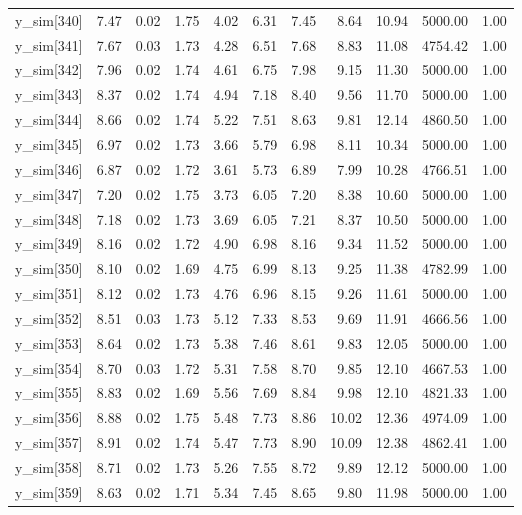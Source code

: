 \begin{table}[ht]
\begin{tabular}{rrrrrrrrrrr}
  y\_sim[340] & 7.47 & 0.02 & 1.75 & 4.02 & 6.31 & 7.45 & 8.64 & 10.94 & 5000.00 & 1.00 \\ 
  y\_sim[341] & 7.67 & 0.03 & 1.73 & 4.28 & 6.51 & 7.68 & 8.83 & 11.08 & 4754.42 & 1.00 \\ 
  y\_sim[342] & 7.96 & 0.02 & 1.74 & 4.61 & 6.75 & 7.98 & 9.15 & 11.30 & 5000.00 & 1.00 \\ 
  y\_sim[343] & 8.37 & 0.02 & 1.74 & 4.94 & 7.18 & 8.40 & 9.56 & 11.70 & 5000.00 & 1.00 \\ 
  y\_sim[344] & 8.66 & 0.02 & 1.74 & 5.22 & 7.51 & 8.63 & 9.81 & 12.14 & 4860.50 & 1.00 \\ 
  y\_sim[345] & 6.97 & 0.02 & 1.73 & 3.66 & 5.79 & 6.98 & 8.11 & 10.34 & 5000.00 & 1.00 \\ 
  y\_sim[346] & 6.87 & 0.02 & 1.72 & 3.61 & 5.73 & 6.89 & 7.99 & 10.28 & 4766.51 & 1.00 \\ 
  y\_sim[347] & 7.20 & 0.02 & 1.75 & 3.73 & 6.05 & 7.20 & 8.38 & 10.60 & 5000.00 & 1.00 \\ 
  y\_sim[348] & 7.18 & 0.02 & 1.73 & 3.69 & 6.05 & 7.21 & 8.37 & 10.50 & 5000.00 & 1.00 \\ 
  y\_sim[349] & 8.16 & 0.02 & 1.72 & 4.90 & 6.98 & 8.16 & 9.34 & 11.52 & 5000.00 & 1.00 \\ 
  y\_sim[350] & 8.10 & 0.02 & 1.69 & 4.75 & 6.99 & 8.13 & 9.25 & 11.38 & 4782.99 & 1.00 \\ 
  y\_sim[351] & 8.12 & 0.02 & 1.73 & 4.76 & 6.96 & 8.15 & 9.26 & 11.61 & 5000.00 & 1.00 \\ 
  y\_sim[352] & 8.51 & 0.03 & 1.73 & 5.12 & 7.33 & 8.53 & 9.69 & 11.91 & 4666.56 & 1.00 \\ 
  y\_sim[353] & 8.64 & 0.02 & 1.73 & 5.38 & 7.46 & 8.61 & 9.83 & 12.05 & 5000.00 & 1.00 \\ 
  y\_sim[354] & 8.70 & 0.03 & 1.72 & 5.31 & 7.58 & 8.70 & 9.85 & 12.10 & 4667.53 & 1.00 \\ 
  y\_sim[355] & 8.83 & 0.02 & 1.69 & 5.56 & 7.69 & 8.84 & 9.98 & 12.10 & 4821.33 & 1.00 \\ 
  y\_sim[356] & 8.88 & 0.02 & 1.75 & 5.48 & 7.73 & 8.86 & 10.02 & 12.36 & 4974.09 & 1.00 \\ 
  y\_sim[357] & 8.91 & 0.02 & 1.74 & 5.47 & 7.73 & 8.90 & 10.09 & 12.38 & 4862.41 & 1.00 \\ 
  y\_sim[358] & 8.71 & 0.02 & 1.73 & 5.26 & 7.55 & 8.72 & 9.89 & 12.12 & 5000.00 & 1.00 \\ 
  y\_sim[359] & 8.63 & 0.02 & 1.71 & 5.34 & 7.45 & 8.65 & 9.80 & 11.98 & 5000.00 & 1.00 \\ 

\end{tabular}
\end{table}
